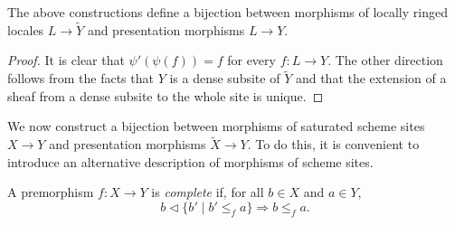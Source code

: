 \documentclass[reqno]{amsart}
\theoremstyle{definition}
\theoremstyle{remark}
\numberwithin{figure}{section}
\newcommand{\cover}{\triangleleft}
\begin{document}
\begin{lem}
The above constructions define a bijection between morphisms of locally ringed locales $L \to \widetilde{Y}$ and presentation morphisms $L \to Y$.
\end{lem}
\begin{proof}
It is clear that $\psi'(\psi(f)) = f$ for every $f : L \to Y$.
The other direction follows from the facts that $Y$ is a dense subsite of $\widetilde{Y}$ and that the extension of a sheaf from a dense subsite to the whole site is unique.
\end{proof}

We now construct a bijection between morphisms of saturated scheme sites $X \to Y$ and presentation morphisms $\widetilde{X} \to Y$.
To do this, it is convenient to introduce an alternative description of morphisms of scheme sites.

\begin{defn}[complete]
A premorphism $f : X \to Y$ is \emph{complete} if, for all $b \in X$ and $a \in Y$,
\[ b \cover \{ b' \mid b' \leq_f a \} \Rightarrow b \leq_f a. \]
\end{defn}
\end{document}
